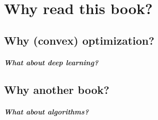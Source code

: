 \chapter{Why read this book?}
\label{chap:why_this_book}

\section{Why (convex) optimization?}



\paragraph{What about deep learning?}

\section{Why another book?}


\paragraph{What about algorithms?}

